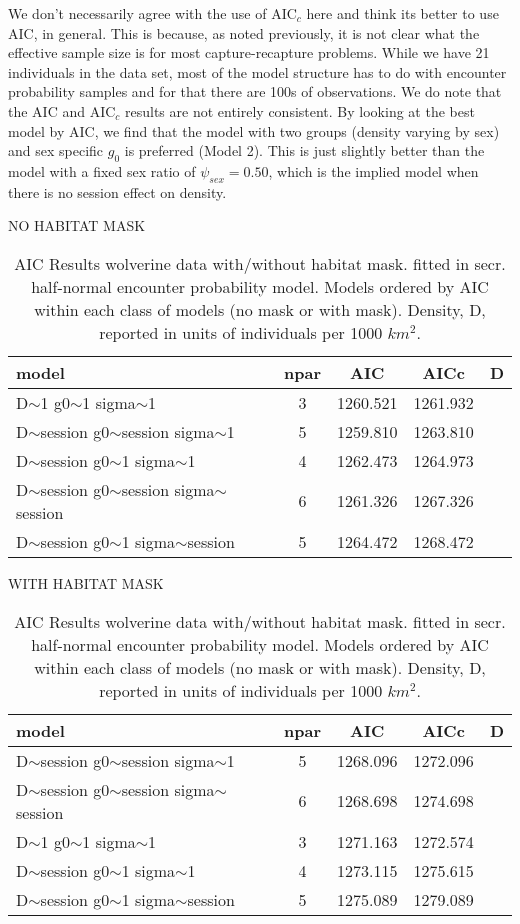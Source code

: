 We don't necessarily agree with the use of AIC$_c$ here and think its
better to use AIC, in general. This is because, as noted previously,
it is not clear what the
effective sample size is for most capture-recapture problems. While we
have 21 individuals in the data set, most of the model structure has
to do with encounter probability samples and for that there are 100s
of observations. We do note that the AIC and AIC$_c$ results are not
entirely consistent.  By looking at the best model by AIC, we find
that the model with two groups (density varying by sex) and sex specific $g_{0}$ is
preferred (Model 2). This is just slightly better than the model with
a fixed sex ratio of $\psi_{sex} = 0.50$, which is the implied model
when there is no session effect on density.


\begin{table}[ht]
\centering
\caption{
AIC Results wolverine data with/without habitat mask. fitted
in secr. half-normal encounter probability model. Models ordered by
AIC within each class of models (no mask or with mask).  Density, D,
reported in units of individuals per 1000 $km^2$.
}
\hline \hline
\hspace{1in} NO HABITAT MASK \\
\begin{tabular}{lcccc}
  model & npar & AIC & AICc & D \\ \hline
D$\sim$1 g0$\sim$1 sigma$\sim$1                &    3&  1260.521& 1261.932 & \\
D$\sim$session g0$\sim$session sigma$\sim$1    &    5&  1259.810& 1263.810 &\\
D$\sim$session g0$\sim$1 sigma$\sim$1          &    4&  1262.473& 1264.973 &\\
D$\sim$session g0$\sim$session sigma$\sim$session&  6&  1261.326& 1267.326 &\\
D$\sim$session g0$\sim$1 sigma$\sim$session      &  5&  1264.472& 1268.472 &\\
\end{tabular}
\hline \hline
\hspace{1in} WITH HABITAT MASK \\
\begin{tabular}{lcccc}
  model & npar & AIC & AICc & D \\ \hline
D$\sim$session g0$\sim$session sigma$\sim$1       &    5& 1268.096& 1272.096 & \\
D$\sim$session g0$\sim$session sigma$\sim$session &    6& 1268.698& 1274.698 &\\
D$\sim$1       g0$\sim$1       sigma$\sim$1       &    3& 1271.163& 1272.574 &\\
D$\sim$session g0$\sim$1       sigma$\sim$1       &    4& 1273.115& 1275.615 &\\
D$\sim$session g0$\sim$1       sigma$\sim$session &    5& 1275.089& 1279.089 &\\
\end{tabular}
\hline
\label{gof.tab.aic}
\end{table}


